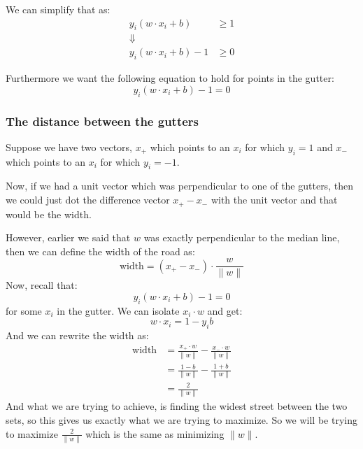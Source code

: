     We can simplify that as:
    \begin{align*}
        y_i (w \cdot x_i + b) &\geq 1\\
        \Downarrow\\
        y_i (w \cdot x_i + b) - 1 &\geq 0
    \end{align*}
    
    Furthermore we want the following equation to hold for points in the gutter:
    \begin{equation*}
        y_i (w \cdot x_i + b) - 1 = 0
    \end{equation*}
    
    \subsubsection{The distance between the gutters}
    Suppose we have two vectors, $x_+$ which points to an $x_i$ for which $y_i 
    = 1$ and $x_-$ which points to an $x_i$ for which $y_i = -1$.
    
    Now, if we had a unit vector which was perpendicular to one of the gutters, 
    then we could just dot the difference vector $x_+-x_-$ with the unit vector 
    and that would be the width.
    
    However, earlier we said that $w$ was exactly perpendicular to the median 
    line, then we can define the width of the road as:
    \begin{equation*}
        \text{width} = (x_+-x_-) \cdot \frac{w}{\|w\|}
    \end{equation*}
    Now, recall that:
    \begin{equation*}
        y_i (w \cdot x_i + b) - 1 = 0
    \end{equation*}
    for some $x_i$ in the gutter. We can isolate $x_i \cdot w$ and get:
    \begin{equation*}
        w \cdot x_i = 1-y_ib
    \end{equation*}
    And we can rewrite the width as:
    \begin{align*}
        \text{width} &= \frac{x_+ \cdot w}{\|w\|} - \frac{x_- \cdot w}{\|w\|}\\
            &= \frac{1 - b}{\|w\|} - \frac{1 + b}{\|w\|}\\
            &= \frac{2}{\|w\|}
    \end{align*}
    And what we are trying to achieve, is finding the widest street between the 
    two sets, so this gives us exactly what we are trying to maximize. So we 
    will be trying to maximize $\frac{2}{\|w\|}$ which is the same as 
    minimizing $\|w\|$.
    
